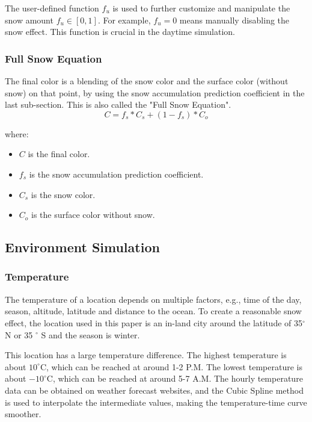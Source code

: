 \documentclass{article}
\begin{document}
The user-defined function \( f_{u} \) is used to further customize and manipulate the snow amount \( f_{u} \in [0, 1] \). For example, 
\( f_{u}=0 \) means manually disabling the snow effect. This function is crucial in the daytime simulation.

\subsubsection {Full Snow Equation}
The final color is a blending of the snow color and the surface color (without snow) on that point, by using the snow accumulation 
prediction coefficient in the last sub-section. This is also called the "Full Snow Equation".
\[
  C = f_{s} * C_{s} + (1-f_{s}) * C_{o}
\]

where:
\begin{itemize}
  \item \( C \) is the final color.
  \item \( f_{s} \) is the snow accumulation prediction coefficient.
  \item \( C_{s} \) is the snow color.
  \item \( C_{o} \) is the surface color without snow.
\end{itemize}

\subsection {Environment Simulation}

\subsubsection {Temperature}
The temperature of a location depends on multiple factors, e.g., time of the day, season, altitude, latitude and distance to the ocean. 
To create a reasonable snow effect, the location used in this paper is an in-land city around the latitude of 35$^{\circ}$ N or 35
$^{\circ}$ S and the season is winter.

This location has a large temperature difference. The highest temperature is about \(10^\circ\mathrm{C}\), which can be reached at 
around 1-2 P.M. The lowest temperature is about \(-10^\circ\mathrm{C}\), which can be reached at around 5-7 A.M. The hourly 
temperature data can be obtained on weather forecast websites, and the Cubic Spline method is used to interpolate the intermediate 
values, making the temperature-time curve smoother.
\end{document}
